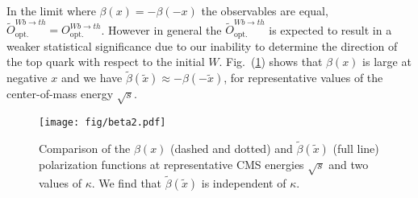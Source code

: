 \documentclass[11pt,a4paper]{article}
\begin{document}
In the limit where $\beta(x) = - \beta(-x)$ the observables are equal,
$\tilde O_\mathrm{opt.}^{Wb \to th} = O_\mathrm{opt.}^{Wb \to th}$. However in general the $\tilde O_\mathrm{opt.}^{Wb \to th}$ is expected to result in a weaker statistical significance due to our inability to determine the direction of the top quark with respect to the initial $W$. Fig.~(\ref{fig:B2signswitch}) shows that  $\beta(x)$ is large at negative $x$ and we have $\tilde\beta(\tilde x) \approx -\beta(-\tilde x)$, for representative values of the center-of-mass energy $\sqrt{s}$.


\begin{figure}[t]
	\centering\texttt{[image: fig/beta2.pdf]}
	\caption{Comparison of the $\beta(x)$ (dashed and dotted) and $\tilde \beta(\tilde x)$ (full line) polarization functions at representative CMS energies $\sqrt{s}$ and two values of $\kappa$. We find that $\tilde \beta(\tilde x)$ is independent of $\kappa$.}
	\label{fig:B2signswitch}
\end{figure}
\end{document}
